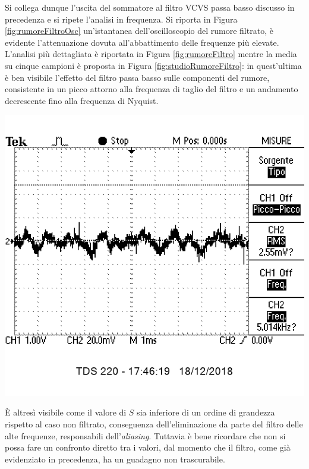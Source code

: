 \documentclass[10pt,oneside,a4paper]{article}
\newenvironment{Figure}
  {\par\medskip\noindent\minipage{\linewidth}}
  {\endminipage\par\medskip}
\begin{document}
\begin{multicols}{2}
Si collega dunque l'uscita del sommatore al filtro VCVS passa basso discusso in precedenza e si ripete l'analisi in frequenza. Si riporta in Figura \ref{fig:rumoreFiltroOsc} un'istantanea dell'oscilloscopio del rumore filtrato, è evidente l'attenuazione dovuta all'abbattimento delle frequenze più elevate. L'analisi più dettagliata è riportata in Figura \ref{fig:rumoreFiltro} mentre la media su cinque campioni è proposta in Figura \ref{fig:studioRumoreFiltro}: in quest'ultima è ben visibile l'effetto del filtro passa basso sulle componenti del rumore, consistente in un picco attorno alla frequenza di taglio del filtro e un andamento decrescente fino alla frequenza di Nyquist. 
\begin{Figure}
	\begin{center}
	\includegraphics[width=0.8\linewidth]{rumoreFIltroOsc}
	\label{fig:rumoreFiltroOsc}
	\end{center}
\end{Figure}

È altresì visibile come il valore di $S$ sia inferiore di un ordine di grandezza rispetto al caso non filtrato, conseguenza dell'eliminazione da parte del filtro delle alte frequenze, responsabili dell'\emph{aliasing}. Tuttavia è bene ricordare che non si possa fare un confronto diretto tra i valori, dal momento che il filtro, come già evidenziato in precedenza, ha un guadagno non trascurabile.


\end{multicols}
\end{document}

